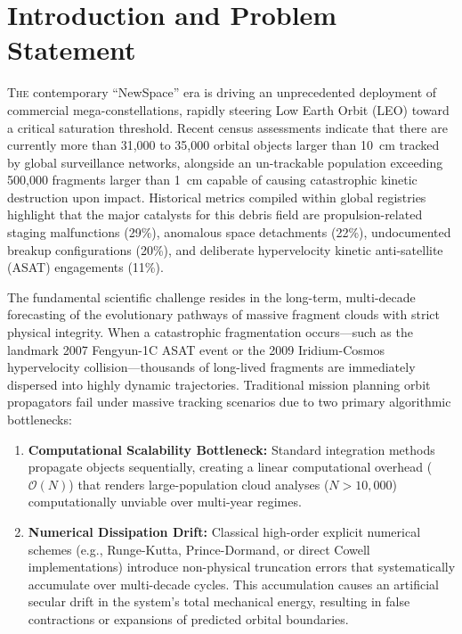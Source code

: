 \documentclass[11pt,letterpaper]{article}
\begin{document}
\section{Introduction and Problem Statement}
\lettrine{T}{he} contemporary ``NewSpace'' era is driving an unprecedented deployment of commercial mega-constellations, rapidly steering Low Earth Orbit (LEO) toward a critical saturation threshold. Recent census assessments indicate that there are currently more than 31,000 to 35,000 orbital objects larger than 10~cm tracked by global surveillance networks, alongside an un-trackable population exceeding 500,000 fragments larger than 1~cm capable of causing catastrophic kinetic destruction upon impact. Historical metrics compiled within global registries highlight that the major catalysts for this debris field are propulsion-related staging malfunctions (29\%), anomalous space detachments (22\%), undocumented breakup configurations (20\%), and deliberate hypervelocity kinetic anti-satellite (ASAT) engagements (11\%).

The fundamental scientific challenge resides in the long-term, multi-decade forecasting of the evolutionary pathways of massive fragment clouds with strict physical integrity. When a catastrophic fragmentation occurs---such as the landmark 2007 Fengyun-1C ASAT event or the 2009 Iridium-Cosmos hypervelocity collision---thousands of long-lived fragments are immediately dispersed into highly dynamic trajectories. Traditional mission planning orbit propagators fail under massive tracking scenarios due to two primary algorithmic bottlenecks:

\begin{enumerate}
    \item \textbf{Computational Scalability Bottleneck:} Standard integration methods propagate objects sequentially, creating a linear computational overhead ($\mathcal{O}(N)$) that renders large-population cloud analyses ($N > 10,000$) computationally unviable over multi-year regimes.
    \item \textbf{Numerical Dissipation Drift:} Classical high-order explicit numerical schemes (e.g., Runge-Kutta, Prince-Dormand, or direct Cowell implementations) introduce non-physical truncation errors that systematically accumulate over multi-decade cycles. This accumulation causes an artificial secular drift in the system's total mechanical energy, resulting in false contractions or expansions of predicted orbital boundaries.
\end{enumerate}
\end{document}
